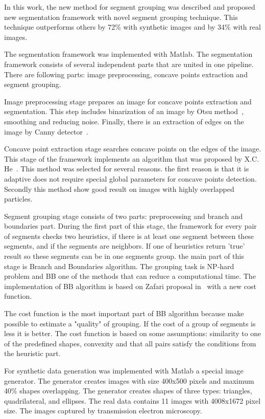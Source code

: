 \documentclass{lutmscthesis}[2010/09/22]
\begin{document}
In this work, the new method for segment grouping was described and proposed new segmentation framework with novel segment grouping technique.  This technique outperforms others by 72\% with synthetic images and by 34\% with real images.

The segmentation framework was implemented with Matlab. The segmentation framework consists of several independent parts that are united in one pipeline. There are following parts: image preprocessing, concave points extraction and segment grouping. 

Image preprocessing stage prepares an image for concave points extraction and segmentation. This step includes binarization of an image by Otsu method~\cite{otsu}, smoothing and reducing noise. Finally, there is an extraction of edges on the image by Canny detector~\cite{Canny}. 

Concave point extraction stage searches concave points on the edges of the image. This stage of the framework implements an algorithm that was proposed by X.C. He~\cite{CSS}. This method was selected for several reasons. the first reason is that it is adaptive does not require special global parameters for concave points detection. Secondly this method show good result on images with highly overlapped particles.  

Segment grouping stage consists of two parts: preprocessing and branch and boundaries part. During the first part of this stage, the framework for every pair of segments checks two heuristics, if there is at least one segment between these segments, and if the segments are neighbors. If one of heuristics return 'true' result so these segments can be in one segments group. the main part of this stage is Branch and Boundaries algorithm. The grouping task is NP-hard~\cite{zafari-bb} problem and BB one of the methods that can reduce a computational time. The implementation of BB algorithm is based on Zafari proposal in~\cite{zafari-bb} with a new cost function.

The cost function is the most important part of BB algorithm because make possible to estimate a "quality" of grouping. If the cost of a group of segments is less it is better. The cost function is based on some assumptions: similarity to one of the predefined shapes, convexity and that all pairs satisfy the conditions from the heuristic part.

For synthetic data generation was implemented with Matlab a special image generator. The generator creates images with size 400x500 pixels and maximum 40\% shapes overlapping. The generator creates shapes of three types: triangles, quadrilateral, and ellipses. The real data contains 11 images with 4008x1672 pixel size. The images captured by transmission electron microscopy.
\end{document}
